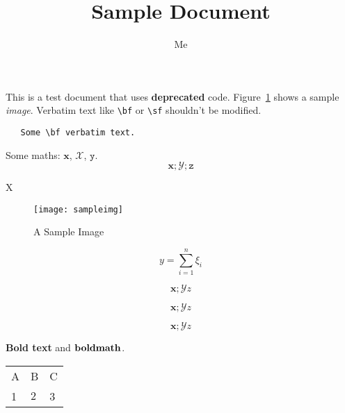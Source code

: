 \documentclass[12pt,a4paper]{article}
\title{Sample Document}
\author{Me}
\newcommand{\boldstuff}[1]{{\bf #1}}
\begin{document}
\maketitle

This is a test {\sffamily document} that uses {\bfseries  deprecated} code.
Figure~\ref{fig:sample} shows a sample {\itshape image}.
  Verbatim text like \verb|\bf| or \verb|\sf| shouldn't be
modified. 
\begin{verbatim}
   Some \bf verbatim text.
\end{verbatim}

Some maths: $\mathbf{x}$, \begin{math}\mathcal{X}\end{math},
\(\mathtt{y}\).
\[
  \mathbf{x}; \mathcal{Y}; \mathtt{z}
\]

   {\par\centering X\par}

\begin{figure}
{\par\centering\texttt{[image: sampleimg]}\par}
\caption{A Sample Image}
\label{fig:sample}
\end{figure}

\[y = \sum_{i=1}^{n} \xi_{i}\]

\[\mathbf{x}; \mathcal{Y} \mathit{z}\]

\begin{displaymath}
\mathbf{x}; \mathcal{Y} \mathit{z}
\end{displaymath}

\begin{equation}
\mathbf{x}; \mathcal{Y} \mathit{z}
\end{equation}

\boldstuff{Bold text} and $\boldstuff{bold math}$.

\begin{table}
{\begin{tabular}{lll}
A & B & C\\
1 & $2$ & 3
\end{tabular}
}
\end{table}
\end{document}
